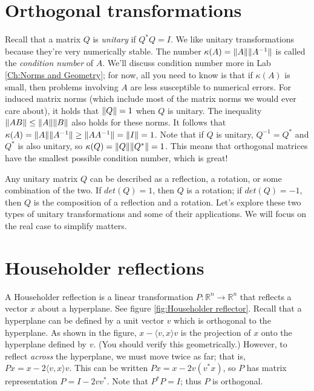 \label{Ch:Householder Reflections}
\label{Ch:Givens}
\label{Ch:Canonical Transformations}


\section*{Orthogonal transformations}
Recall that a matrix $Q$ is \emph{unitary} if $Q^* Q = I$. We like unitary transformations because they're very numerically stable. The number $\kappa(A) = \lVert A\rVert \lVert A^{-1}\rVert$ is called the \emph{condition number} of $A$. We'll discuss condition number more in Lab \ref{Ch:Norms and Geometry}; for now, all you need to know is that if $\kappa(A)$ is small, then problems involving $A$ are less susceptible to numerical errors. For induced matrix norms (which include most of the matrix norms we would ever care about),  it holds that $\lVert Q\rVert=1$ when $Q$ is unitary. The inequality $\lVert AB\rVert \leq \lVert A\rVert \lVert B\rVert$ also holds for these norms. It follows that $\kappa(A) = \lVert A\rVert \lVert A^{-1}\rVert \geq \lVert A A^{-1}\rVert = \lVert I\rVert = 1$. Note that if $Q$ is unitary, $Q^{-1} = Q^*$ and $Q^*$ is also unitary, so $\kappa(Q) = \lVert Q\rVert \lVert Q^*\rVert = 1$. This means that orthogonal matrices have the smallest possible condition number, which is great!

Any unitary matrix $Q$ can be described as a reflection, a rotation, or some combination of the two. If $det(Q) = 1$, then $Q$ is a rotation; if $det(Q) = -1$, then $Q$  is the composition of a reflection and a rotation.  Let's explore these two types of unitary transformations and some of their applications. We will focus on the real case to simplify matters.

\section*{Householder reflections}
A Householder reflection is a linear transformation $P: \mathbb{R}^n \rightarrow \mathbb{R}^n$ that reflects a vector $x$ about a hyperplane. See figure \ref{fig:Householder reflector}. Recall that a hyperplane can be defined by a unit vector $v$ which is orthogonal to the hyperplane. As shown in the figure, $x - \langle v,x \rangle v$ is the projection of $x$ onto the hyperplane defined by $v$. (You should verify this geometrically.) However, to reflect \emph{across} the hyperplane, we must move twice as far; that is, $Px = x - 2\langle v,x \rangle v$. This can be written $Px = x - 2v(v^\ast x)$, so $P$ has matrix representation $P = I - 2vv^\ast$. Note that $P^\ast P = I$; thus $P$ is orthogonal.


